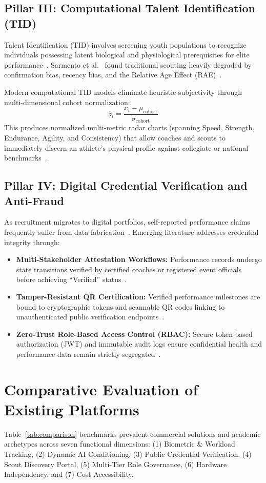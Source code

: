 \documentclass[conference]{IEEEtran}
\begin{document}
\subsection{Pillar III: Computational Talent Identification (TID)}
Talent Identification (TID) involves screening youth populations to recognize individuals possessing latent biological and physiological prerequisites for elite performance~\cite{vaeyens2008}. Sarmento et al.~\cite{sarmento2018} found traditional scouting heavily degraded by confirmation bias, recency bias, and the Relative Age Effect (RAE)~\cite{baker2010}.

Modern computational TID models eliminate heuristic subjectivity through multi-dimensional cohort normalization:
\begin{equation}
z_i = \frac{x_i - \mu_{\text{cohort}}}{\sigma_{\text{cohort}}}
\end{equation}
This produces normalized multi-metric radar charts (spanning Speed, Strength, Endurance, Agility, and Consistency) that allow coaches and scouts to immediately discern an athlete's physical profile against collegiate or national benchmarks~\cite{coutts2016}.

\subsection{Pillar IV: Digital Credential Verification and Anti-Fraud}
As recruitment migrates to digital portfolios, self-reported performance claims frequently suffer from data fabrication~\cite{phillips2021}. Emerging literature addresses credential integrity through:
\begin{itemize}
    \item \textbf{Multi-Stakeholder Attestation Workflows:} Performance records undergo state transitions verified by certified coaches or registered event officials before achieving ``Verified'' status~\cite{anderson2022}.
    \item \textbf{Tamper-Resistant QR Certification:} Verified performance milestones are bound to cryptographic tokens and scannable QR codes linking to unauthenticated public verification endpoints~\cite{weyl2022}.
    \item \textbf{Zero-Trust Role-Based Access Control (RBAC):} Secure token-based authorization (JWT) and immutable audit logs ensure confidential health and performance data remain strictly segregated~\cite{sandhu1996}.
\end{itemize}

\section{Comparative Evaluation of Existing Platforms}
Table~\ref{tab:comparison} benchmarks prevalent commercial solutions and academic archetypes across seven functional dimensions: (1) Biometric \& Workload Tracking, (2) Dynamic AI Conditioning, (3) Public Credential Verification, (4) Scout Discovery Portal, (5) Multi-Tier Role Governance, (6) Hardware Independency, and (7) Cost Accessibility.
\end{document}
